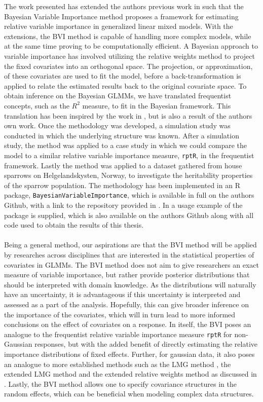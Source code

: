 


The work presented has extended the authors previous work in \citet{Arnstad} such that the Bayesian Variable Importance method proposes a framework for estimating relative variable importance in generalized linear mixed models. With the extensions, the BVI method is capable of handling more complex models, while at the same time proving to be computationally efficient. A Bayesian approach to variable importance has involved utilizing the relative weights method \citep{johnson_relative_weights} to project the fixed covariates into an orthogonal space. The projection, or approximation, of these covariates are used to fit the model, before a back-transformation is applied to relate the estimated results back to the original covariate space. To obtain inference on the Bayesian GLMMs, we have translated frequentist concepts, such as the $R^2$ measure, to fit in the Bayesian framework. This translation has been inspired by the work in \citet{gelman2017rsquared}, but is also a result of the authors own work. Once the methodology was developed, a simulation study was conducted in which the underlying structure was known. After a simulation study, the method was applied to a case study in which we could compare the model to a similar relative variable importance measure, \texttt{rptR}, in the frequentist framework. Lastly the method was applied to a dataset gathered from house sparrows on Helgelandskysten, Norway, to investigate the heritability properties of the sparrow population. The methodology has been implemented in an R package, \texttt{BayesianVariableImportance}, which is available in full on the authors Github, with a link to the repository provided in . In  a usage example of the package is supplied, which is also available on the authors Github along with all code used to obtain the results of this thesis.
\\
\\
Being a general method, our aspirations are that the BVI method will be applied by researches across disciplines that are interested in the statistical properties of covariates in GLMMs. The BVI method does not aim to give researchers an exact measure of variable importance, but rather provide posterior distributions that should be interpreted with domain knowledge. As the distributions will naturally have an uncertainty, it is advantageous if this uncertainty is interpreted and assessed as a part of the analysis. Hopefully, this can give broader inference on the importance of the covariates, which will in turn lead to more informed conclusions on the effect of covariates on a response. In itself, the BVI poses an analogue to the frequentist relative variable importance measure \texttt{rptR} for non-Gaussian responses, but with the added benefit of directly estimating the relative importance distributions of fixed effects. Further, for gaussian data, it also poses an analogue to more established methods such as the LMG method \citep{gromping2006relative}, the extended LMG method \citep{matre} and the extended relative weights method \citep{matre} as discussed in \citet{Arnstad}. Lastly, the BVI method allows one to specify covariance structures in the random effects, which can be beneficial when modeling complex data structures.
